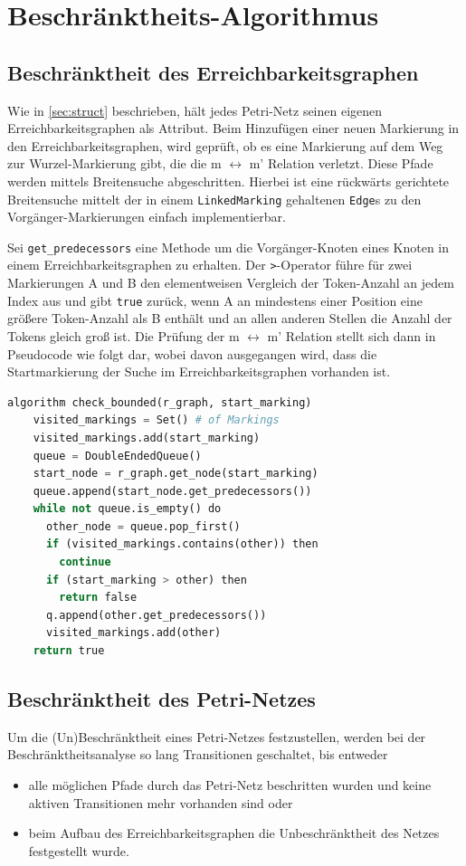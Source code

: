 \section{Beschränktheits-Algorithmus}
\label{sec:algo}

\subsection{Beschränktheit des Erreichbarkeitsgraphen}
Wie in \cref{sec:struct} beschrieben, hält jedes Petri-Netz seinen eigenen
Erreichbarkeitsgraphen als Attribut. Beim Hinzufügen einer neuen Markierung in
den Erreichbarkeitsgraphen, wird geprüft, ob es eine Markierung auf dem Weg zur
Wurzel-Markierung gibt, die die m $\leftrightarrow$ m' Relation verletzt. Diese
Pfade werden mittels Breitensuche abgeschritten. Hierbei ist eine rückwärts
gerichtete Breitensuche mittelt der in einem \texttt{LinkedMarking} gehaltenen
\texttt{Edge}s zu den Vorgänger-Markierungen einfach implementierbar.

Sei \texttt{get\_predecessors} eine Methode um die Vorgänger-Knoten eines Knoten
in einem Erreichbarkeitsgraphen zu erhalten. Der \texttt{\textgreater}-Operator
führe für zwei Markierungen A und B den elementweisen Vergleich der Token-Anzahl
an jedem Index aus und gibt \texttt{true} zurück, wenn A an mindestens einer
Position eine größere Token-Anzahl als B enthält und an allen anderen Stellen
die Anzahl der Tokens gleich groß ist. %
Die Prüfung der m $\leftrightarrow$ m' Relation stellt
sich dann in Pseudocode wie folgt dar, wobei davon ausgegangen wird, dass die
Startmarkierung der Suche im Erreichbarkeitsgraphen vorhanden ist.

\begin{lstlisting}[language=python, morekeywords={do, algorithm, then}]
  algorithm check_bounded(r_graph, start_marking)
    visited_markings = Set() # of Markings
    visited_markings.add(start_marking)
    queue = DoubleEndedQueue()
    start_node = r_graph.get_node(start_marking)
    queue.append(start_node.get_predecessors())
    while not queue.is_empty() do
      other_node = queue.pop_first()
      if (visited_markings.contains(other)) then
        continue
      if (start_marking > other) then
        return false
      q.append(other.get_predecessors())
      visited_markings.add(other)
    return true
\end{lstlisting}

\subsection{Beschränktheit des Petri-Netzes}
Um die (Un)Beschränktheit eines Petri-Netzes festzustellen, werden bei der
Beschränktheitsanalyse so lang Transitionen geschaltet, bis entweder
\begin{itemize}
  \item alle möglichen Pfade durch das Petri-Netz beschritten wurden und keine
        aktiven Transitionen mehr vorhanden sind oder
  \item beim Aufbau des Erreichbarkeitsgraphen die Unbeschränktheit des Netzes
        festgestellt wurde.
\end{itemize}

